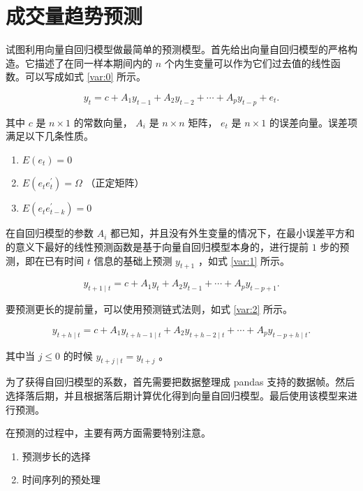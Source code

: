 \section{成交量趋势预测}

试图利用向量自回归模型做最简单的预测模型。首先给出向量自回归模型的严格构造。它描述了在同一样本期间内的 $n$ 个内生变量可以作为它们过去值的线性函数。可以写成如式 \ref{var:0} 所示。

\begin{equation}
  \label{var:0}
  y_{t}=c+A_{1}y_{t-1}+A_{2}y_{t-2}+\cdots +A_{p}y_{t-p}+e_{t}.
\end{equation}

其中 $c$ 是 $n\times 1$ 的常数向量， $A_{i}$ 是 $n\times n$ 矩阵， $e_{t}$ 是 $n\times 1$ 的误差向量。误差项满足以下几条性质。

\begin{enumerate}
  \item $E(e_{t})=0$
  \item $E(e_{t}e_{t}^{\prime})=\Omega$ （正定矩阵）
  \item $E(e_{t}e_{t-k}^{\prime})=0$
\end{enumerate}

在自回归模型的参数 $A_{i}$ 都已知，并且没有外生变量的情况下，在最小误差平方和的意义下最好的线性预测函数是基于向量自回归模型本身的，进行提前 $1$ 步的预测，即在已有时间 $t$ 信息的基础上预测 $y_{t+1}$ ，如式 \ref{var:1} 所示。

\begin{equation}
  \label{var:1}
  y_{t+1\mid t}=c+A_{1}y_{t}+A_{2}y_{t-1}+\cdots +A_{p}y_{t-p+1}.
\end{equation}

要预测更长的提前量，可以使用预测链式法则，如式 \ref{var:2} 所示。

\begin{equation}
  \label{var:2}
  y_{t+h\mid t}=c+A_{1}y_{t+h-1\mid t}+A_{2}y_{t+h-2\mid t}+\cdots +A_{p}y_{t-p+h\mid t}.
\end{equation}

其中当 $j\leq 0$ 的时候 $y_{t+j\mid t}=y_{t+j}$ 。

为了获得自回归模型的系数，首先需要把数据整理成 pandas 支持的数据帧。然后选择落后期，并且根据落后期计算优化得到向量自回归模型。最后使用该模型来进行预测。

在预测的过程中，主要有两方面需要特别注意。

\begin{enumerate}
  \item 预测步长的选择
  \item 时间序列的预处理
\end{enumerate}

